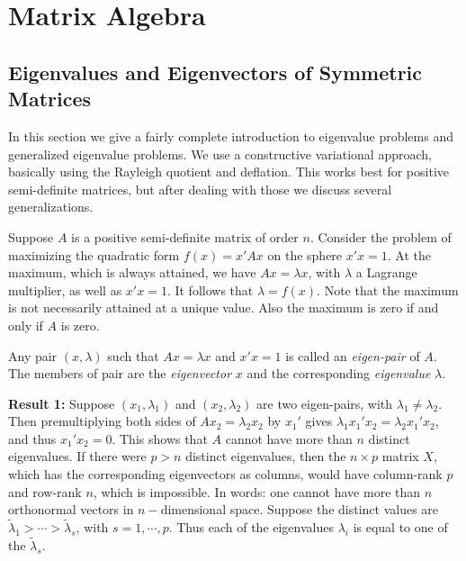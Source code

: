 \documentclass[
  12pt,
]{book}
\begin{document}
\hypertarget{matrix-algebra}{%
\section{Matrix Algebra}\label{matrix-algebra}}

\hypertarget{eigenvalues-and-eigenvectors-of-symmetric-matrices}{%
\subsection{Eigenvalues and Eigenvectors of Symmetric Matrices}\label{eigenvalues-and-eigenvectors-of-symmetric-matrices}}

In this section we give a fairly complete introduction to eigenvalue problems and generalized eigenvalue problems. We use a constructive variational approach, basically using the Rayleigh quotient and deflation. This works best for positive semi-definite matrices, but after dealing with those we discuss several generalizations.

Suppose \(A\) is a positive semi-definite matrix of order \(n\).
Consider the problem of maximizing the quadratic form \(f(x)=x'Ax\) on the sphere \(x'x=1\). At the maximum, which is always attained,
we have \(Ax=\lambda x\), with \(\lambda\) a Lagrange multiplier, as well as \(x'x=1\). It follows that \(\lambda=f(x)\). Note that the maximum is not necessarily attained at a unique value. Also the maximum is zero if and only if \(A\) is zero.

Any pair \((x,\lambda)\) such that \(Ax=\lambda x\)
and \(x'x=1\) is called an \emph{eigen-pair} of \(A\). The members of pair are the \emph{eigenvector} \(x\) and the corresponding \emph{eigenvalue} \(\lambda\).

\textbf{Result 1:} Suppose \((x_1,\lambda_1)\) and \((x_2,\lambda_2)\)
are two eigen-pairs, with \(\lambda_1\not=\lambda_2.\) Then premultiplying both sides of \(Ax_2=\lambda_2x_2\)
by \(x_1'\) gives \(\lambda_1x_1'x_2=\lambda_2x_1'x_2\),
and thus \(x_1'x_2=0\). This shows that \(A\) cannot have more than \(n\) distinct eigenvalues. If there were \(p>n\) distinct eigenvalues, then the \(n\times p\) matrix \(X\), which has the corresponding eigenvectors as columns, would have column-rank \(p\) and row-rank \(n\), which is impossible. In words: one cannot have more than \(n\) orthonormal vectors in \(n-\)dimensional space. Suppose the distinct values are \(\tilde\lambda_1>\cdots>\tilde\lambda_s\), with \(s=1,\cdots,p.\) Thus each of the eigenvalues \(\lambda_i\) is equal to one of the \(\tilde\lambda_s.\)
\end{document}
